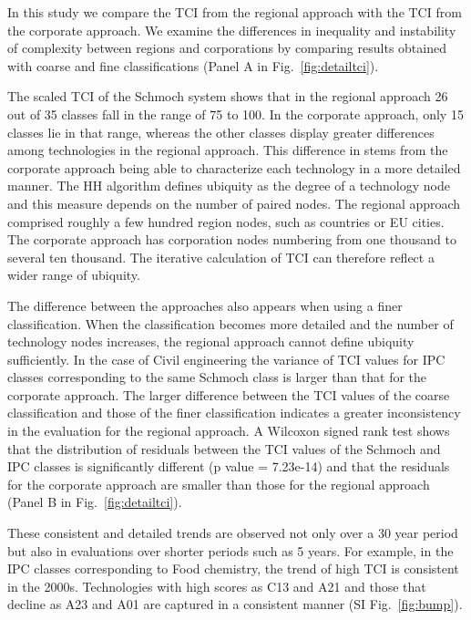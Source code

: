 \documentclass[fleqn,10pt]{wlscirep}
\begin{document}
In this study we compare the TCI from the regional approach with the TCI from the corporate approach. We examine the differences in inequality and instability of complexity between regions and corporations by comparing results obtained with coarse and fine classifications (Panel A in Fig.~\ref{fig:detailtci}).

The scaled TCI of the Schmoch system shows that in the regional approach 26 out of 35 classes fall in the range of 75 to 100. 
In the corporate approach, only 15 classes lie in that range, whereas the other classes display greater differences among technologies in the regional approach. 
This difference in stems from the corporate approach being able to characterize each technology in a more detailed manner. 
The HH algorithm defines ubiquity as the degree of a technology node and this measure depends on the number of paired nodes. 
The regional approach comprised roughly a few hundred region nodes, such as countries or EU cities\cite{Hidalgo2021,Daniel2020technological}.
The corporate approach has corporation nodes numbering from one thousand to several ten thousand. The iterative calculation of TCI can therefore reflect a wider range of ubiquity.

The difference between the approaches also appears when using a finer classification. When the classification becomes more detailed and the number of technology nodes increases, the regional approach cannot define ubiquity sufficiently. 
In the case of Civil engineering the variance of TCI values for IPC classes corresponding to the same Schmoch class is larger than that for the corporate approach. 
The larger difference between the TCI values of the coarse classification and those of the finer classification indicates a greater inconsistency in the evaluation for the regional approach. 
A Wilcoxon signed rank test shows that the distribution of residuals between the TCI values of the Schmoch and IPC classes is significantly different (p value = 7.23e-14) and that the residuals for the corporate approach are smaller than those for the regional approach (Panel B in Fig.~\ref{fig:detailtci}).

These consistent and detailed trends are observed not only over a 30 year period but also in evaluations over shorter periods such as 5 years. For example, in the IPC classes corresponding to Food chemistry, the trend of high TCI is consistent in the 2000s. 
Technologies with high scores as C13 and A21 and those that decline as A23 and A01 are captured in a consistent manner (SI Fig.~\ref{fig:bump}).
\end{document}
